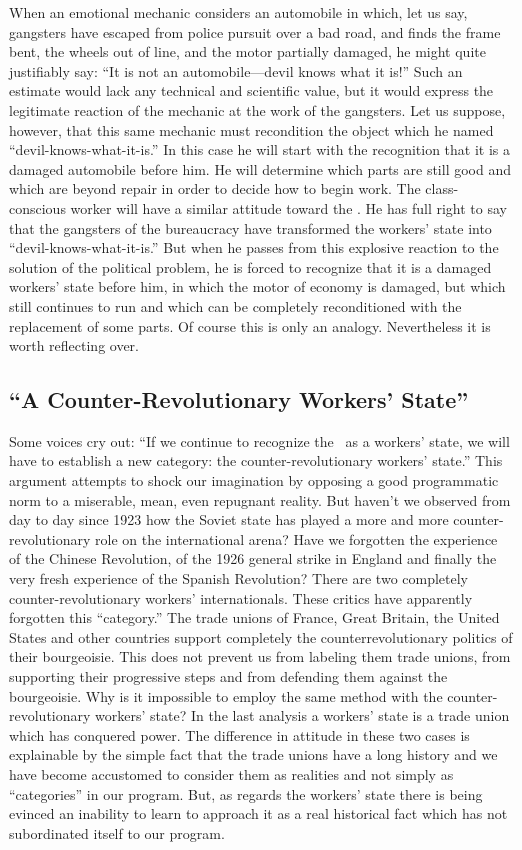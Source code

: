 When an emotional mechanic considers an automobile in which, let us say, gangsters have escaped from police pursuit over a bad road, and finds the frame bent, the wheels out of line, and the motor partially damaged, he might quite justifiably say: “It is not an automobile---devil knows what it is!” Such an estimate would lack any technical and scientific value, but it would express the legitimate reaction of the mechanic at the work of the gangsters. Let us suppose, however, that this same mechanic must recondition the object which he named “devil-knows-what-it-is.” In this case he will start with the recognition that it is a damaged automobile before him. He will determine which parts are still good and which are beyond repair in order to decide how to begin work. The class-conscious worker will have a similar attitude toward the \USSR. He has full right to say that the gangsters of the bureaucracy have transformed the workers’ state into “devil-knows-what-it-is.” But when he passes from this explosive reaction to the solution of the political problem, he is forced to recognize that it is a damaged workers’ state before him, in which the motor of economy is damaged, but which still continues to run and which can be completely reconditioned with the replacement of some parts. Of course this is only an analogy. Nevertheless it is worth reflecting over.

\subsection*{“A Counter-Revolutionary Workers’ State”}

Some voices cry out: “If we continue to recognize the \USSR\ as a workers’ state, we will have to establish a new category: the counter-revolutionary workers’ state.” This argument attempts to shock our imagination by opposing a good programmatic norm to a miserable, mean, even repugnant reality. But haven’t we observed from day to day since 1923 how the Soviet state has played a more and more counter-revolutionary role on the international arena? Have we forgotten the experience of the Chinese Revolution, of the 1926 general strike in England and finally the very fresh experience of the Spanish Revolution? There are two completely counter-revolutionary workers’ internationals. These critics have apparently forgotten this “category.” The trade unions of France, Great Britain, the United States and other countries support completely the counterrevolutionary politics of their bourgeoisie. This does not prevent us from labeling them trade unions, from supporting their progressive steps and from defending them against the bourgeoisie. Why is it impossible to employ the same method with the counter-revolutionary workers’ state? In the last analysis a workers’ state is a trade union which has conquered power. The difference in attitude in these two cases is explainable by the simple fact that the trade unions have a long history and we have become accustomed to consider them as realities and not simply as “categories” in our program. But, as regards the workers’ state there is being evinced an inability to learn to approach it as a real historical fact which has not subordinated itself to our program.

